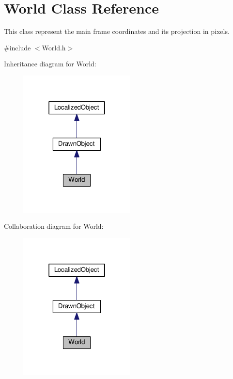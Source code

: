 \hypertarget{classWorld}{}\section{World Class Reference}
\label{classWorld}


This class represent the main frame coordinates and its projection in pixels.  




{\ttfamily \#include $<$World.\+h$>$}



Inheritance diagram for World\+:\nopagebreak
\begin{figure}[H]
\begin{center}
\leavevmode
\includegraphics[width=166pt]{classWorld__inherit__graph}
\end{center}
\end{figure}


Collaboration diagram for World\+:\nopagebreak
\begin{figure}[H]
\begin{center}
\leavevmode
\includegraphics[width=166pt]{classWorld__coll__graph}
\end{center}
\end{figure}
